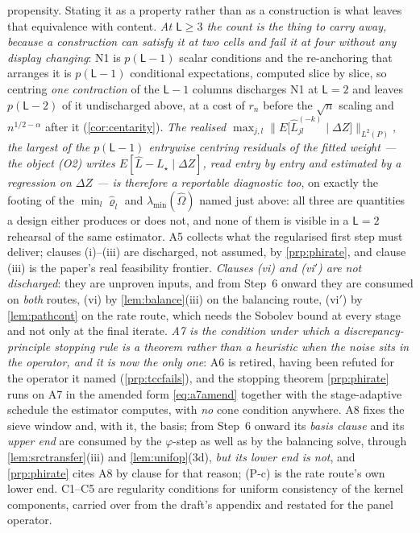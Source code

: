 propensity. Stating it as a property rather than as a construction is what leaves that equivalence with
content. \emph{At $\mathsf L\ge3$ the count is the thing to carry away, because a construction can
satisfy it at two cells and fail it at four without any display changing}: N1 is
$p(\mathsf L-1)$ scalar conditions and the re-anchoring that arranges it is $p(\mathsf L-1)$
conditional expectations, computed slice by slice, so centring \emph{one contraction} of the
$\mathsf L-1$ columns discharges N1 at $\mathsf L=2$ and leaves $p(\mathsf L-2)$ of it undischarged
above, at a cost of $r_n$ before the $\sqrt n$ scaling and $n^{1/2-\alpha}$ after it
(\cref{cor:centarity}). \emph{The realised
$\max_{j,l}\big\|E\big[\hat L^{(-k)}_{jl}\mid\Delta Z\big]\big\|_{L^{2}(P)}$, the largest of the
$p(\mathsf L-1)$ entrywise centring residuals of the fitted weight --- the object \textup{(O2)} writes
$E[\hat L-L_\star\mid\Delta Z]$, read entry by entry and estimated by a regression on $\Delta Z$ ---
is therefore a reportable diagnostic too}, on exactly the footing of the $\min_l\hat\varrho_l$ and
$\lambda_{\min}(\hat\Omega)$ named just above: all three are quantities a design either produces or
does not, and none of them is visible in a $\mathsf L=2$ rehearsal of the same estimator. A5 collects what the regularised first step must deliver; clauses (i)--(iii) are
discharged, not assumed, by \cref{prp:phirate}, and clause (iii) is the paper's real feasibility
frontier. \emph{Clauses (vi) and (vi$'$) are not discharged}: they are unproven inputs, and from Step~6
onward they are consumed on \emph{both} routes, (vi) by \cref{lem:balance}(iii) on the balancing
route, (vi$'$) by \cref{lem:pathcont} on the rate route, which needs the Sobolev bound at every stage
and not only at the final iterate.
\emph{A7 is the condition under which a discrepancy-principle stopping rule is a theorem rather than a
heuristic when the noise sits in the operator, and it is now the only one}: A6 is retired, having been
refuted for the operator it named (\cref{prp:tccfails}), and the stopping theorem
\cref{prp:phirate} runs on A7 in the amended form \eqref{eq:a7amend} together with the
stage-adaptive schedule the estimator computes, with \emph{no} cone condition anywhere. A8 fixes the
sieve window and, with it, the basis; from Step~6 onward its \emph{basis clause} and its \emph{upper
end} are consumed by the $\varphi$-step as well as by the balancing solve, through
\cref{lem:srctransfer}(iii) and \cref{lem:unifop}(3d), \emph{but its lower end is not}, and
\cref{prp:phirate} cites A8 by clause for that reason; (P-c) is the rate route's own lower end. C1--C5 are
regularity conditions for uniform consistency of the kernel components, carried over from the draft's
appendix and restated for the panel operator.

